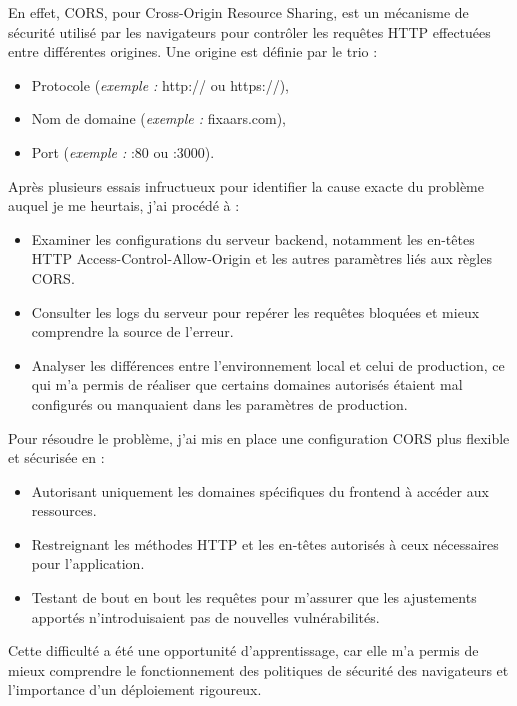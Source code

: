 En effet, CORS, pour Cross-Origin Resource Sharing, est un mécanisme de sécurité utilisé par les navigateurs pour contrôler les requêtes HTTP effectuées entre différentes origines. Une origine est définie par le trio :

\begin{itemize}
    \item Protocole (\textit{exemple :} http:// ou https://),
    \item Nom de domaine (\textit{exemple :} fixaars.com),
    \item Port (\textit{exemple :} :80 ou :3000).
\end{itemize}

Après plusieurs essais infructueux pour identifier la cause exacte du problème auquel je me heurtais, j'ai procédé à :

\begin{itemize}
    \item Examiner les configurations du serveur backend, notamment les en-têtes HTTP Access-Control-Allow-Origin et les autres paramètres liés aux règles CORS.
    \item Consulter les logs du serveur pour repérer les requêtes bloquées et mieux comprendre la source de l’erreur.
    \item Analyser les différences entre l'environnement local et celui de production, ce qui m’a permis de réaliser que certains domaines autorisés étaient mal configurés ou manquaient dans les paramètres de production.
\end{itemize}

Pour résoudre le problème, j'ai mis en place une configuration CORS plus flexible et sécurisée en :

\begin{itemize}
    \item Autorisant uniquement les domaines spécifiques du frontend à accéder aux ressources.
    \item Restreignant les méthodes HTTP et les en-têtes autorisés à ceux nécessaires pour l'application.
    \item Testant de bout en bout les requêtes pour m'assurer que les ajustements apportés n'introduisaient pas de nouvelles vulnérabilités.
\end{itemize}

Cette difficulté a été une opportunité d'apprentissage, car elle m'a permis de mieux comprendre le fonctionnement des politiques de sécurité des navigateurs et l’importance d’un déploiement rigoureux.

